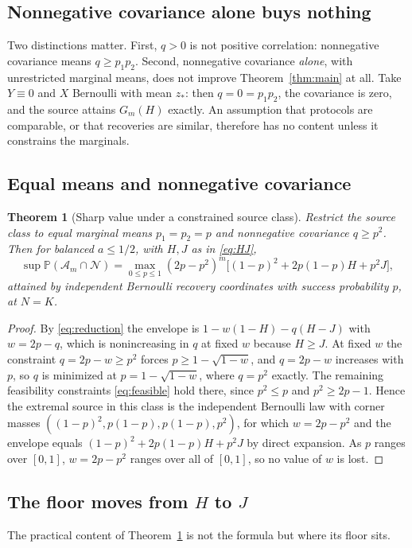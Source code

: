 \documentclass[11pt]{article}
\newtheorem{theorem}{Theorem}[section]
\theoremstyle{remark}\newtheorem{remark}[theorem]{Remark}
\newcommand{\Prob}{\mathbb P}
\newcommand{\Neg}{\mathcal N}
\begin{document}
\subsection{Nonnegative covariance alone buys nothing}
Two distinctions matter. First, $q>0$ is not positive correlation: nonnegative
covariance means $q\ge p_1p_2$. Second, nonnegative covariance \emph{alone},
with unrestricted marginal means, does not improve
Theorem~\ref{thm:main} at all. Take $Y\equiv0$ and $X$ Bernoulli with mean $z_*$:
then $q=0=p_1p_2$, the covariance is zero, and the source attains $G_m(H)$
exactly. An assumption that protocols are comparable, or that recoveries are
similar, therefore has no content unless it constrains the marginals.

\subsection{Equal means and nonnegative covariance}
\begin{theorem}[Sharp value under a constrained source class]\label{thm:constrained}
Restrict the source class to equal marginal means $p_1=p_2=p$ and nonnegative
covariance $q\ge p^2$. Then for balanced $a\le1/2$, with $H,J$ as in
\eqref{eq:HJ},
\begin{equation}\label{eq:constrained}
\sup\Prob(\mathcal A_m\cap\Neg)
=\max_{0\le p\le1}(2p-p^2)^m\big[(1-p)^2+2p(1-p)H+p^2J\big],
\end{equation}
attained by independent Bernoulli recovery coordinates with success probability
$p$, at $N=K$.
\end{theorem}
\begin{proof}
By \eqref{eq:reduction} the envelope is $1-w(1-H)-q(H-J)$ with $w=2p-q$, which is
nonincreasing in $q$ at fixed $w$ because $H\ge J$. At fixed $w$ the constraint
$q=2p-w\ge p^2$ forces $p\ge1-\sqrt{1-w}$, and $q=2p-w$ increases with $p$, so
$q$ is minimized at $p=1-\sqrt{1-w}$, where $q=p^2$ exactly. The remaining
feasibility constraints \eqref{eq:feasible} hold there, since $p^2\le p$ and
$p^2\ge2p-1$. Hence the extremal source in this class is the independent
Bernoulli law with corner masses $((1-p)^2,p(1-p),p(1-p),p^2)$, for which
$w=2p-p^2$ and the envelope equals $(1-p)^2+2p(1-p)H+p^2J$ by direct expansion.
As $p$ ranges over $[0,1]$, $w=2p-p^2$ ranges over all of $[0,1]$, so no value of
$w$ is lost.
\end{proof}

\subsection{The floor moves from \texorpdfstring{$H$}{H} to
\texorpdfstring{$J$}{J}}
The practical content of Theorem~\ref{thm:constrained} is not the formula but
where its floor sits.
\end{document}

